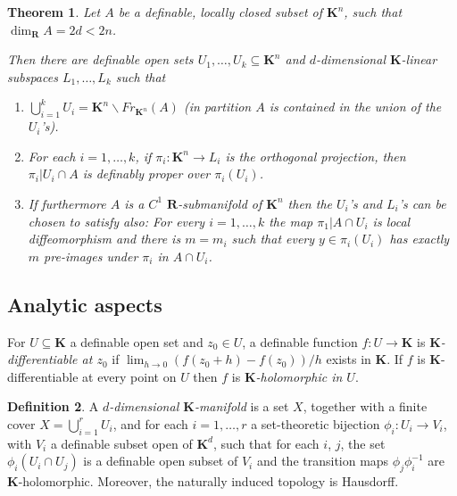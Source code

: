 \documentclass{amsart}
\newtheorem{theorem}{Theorem}[subsection]
\theoremstyle{definition}
\newtheorem{definition}[theorem]{Definition}
\numberwithin{equation}{section}
\begin{document}
\begin{tcolorbox}[title = {The main covering theorem}]
	\begin{theorem}
		Let $A$ be a definable, locally closed subset of $\mathbf{K}^n$,
		such that $\dim_{\mathbf{R}}A = 2d < 2n$.

		Then there are definable open sets $U_1,\dots,U_k \subseteq \mathbf{K}^n$ and $d$-dimensional $\mathbf{K}$-linear subspaces $L_1,\dots,L_k$ such that
		\begin{enumerate}[label = {(\arabic*)}]
			\item $\bigcup_{i=1}^k U_i = \mathbf{K}^n\backslash Fr_{\mathbf{K}^n}(A)$ (in partition $A$ is contained in the union of the $U_i$'s).
			\item For each $i = 1,\dots,k$, if $\pi_i:\mathbf{K}^n \to L_i$ is the orthogonal projection, then $\pi_i|U_i\cap A$ is definably proper over $\pi_i(U_i)$.
			\item If furthermore $A$ is a $C^1$ $\mathbf{R}$-submanifold of $\mathbf{K}^n$ then the $U_i$'s and $L_i$'s can be chosen to satisfy also:
			      For every $i=1,\dots,k$ the map $\pi_1|A\cap U_i$ is local diffeomorphism and there is $m = m_i$ such that every $y \in \pi_i(U_i)$ has exactly $m$ pre-images under $\pi_i$ in $A \cap U_i$.
		\end{enumerate}
	\end{theorem}
\end{tcolorbox}

\subsection{Analytic aspects}
For $U \subseteq \mathbf{K}$ a definable open set and $z_0 \in U$,
a definable function $f: U \to \mathbf{K}$ is \emph{$\mathbf{K}$-differentiable at $z_0$} if $\lim_{h\to 0}(f(z_0+h) - f(z_0))/h$ exists in $\mathbf{K}$.
If $f$ is $\mathbf{K}$-differentiable at every point on $U$ then
$f$ is \emph{$\mathbf{K}$-holomorphic in $U$}.

\begin{definition}
	A \emph{$d$-dimensional $\mathbf{K}$-manifold} is a set $X$,
	together with a finite cover $X = \bigcup_{i=1}^r U_i$,
	and for each $i = 1,\dots,r$ a set-theoretic bijection $\phi_i: U_i \to V_i$,
	with $V_i$ a definable subset open of $\mathbf{K}^d$,
	such that for each $i$, $j$,
	the set $\phi_i(U_i \cap U_j)$ is a definable open subset of $V_i$ and the transition maps $\phi_j \phi_i^{-1}$ are $\mathbf{K}$-holomorphic.
	Moreover, the naturally induced topology is Hausdorff.
\end{definition}
\end{document}
